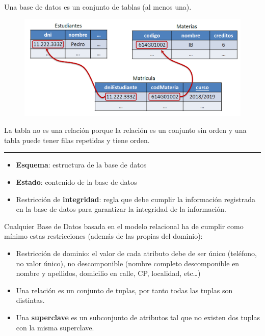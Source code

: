 \documentclass[]{book}
\begin{document}
Una base de datos es un conjunto de tablas (al menos una).

\begin{figure}
\centering
\includegraphics[width=6.25000in]{images/BBDD.png}
\caption{}
\end{figure}

La tabla no es una relación porque la relación es un conjunto sin orden
y una tabla puede tener filas repetidas y tiene orden.

\begin{center}\rule{0.5\linewidth}{\linethickness}\end{center}

\begin{itemize}
\item
  \textbf{Esquema}: estructura de la base de datos
\item
  \textbf{Estado}: contenido de la base de datos
\item
  Restricción de \textbf{integridad}: regla que debe cumplir la
  información registrada en la base de datos para garantizar la
  integridad de la información.
\end{itemize}

Cualquier Base de Datos basada en el modelo relacional ha de cumplir
como mínimo estas restricciones (además de las propias del dominio):

\begin{itemize}
\item
  Restricción de dominio: el valor de cada atributo debe de ser único
  (teléfono, no valor único), no descomponible (nombre completo
  descomponible en nombre y apellidos, domicilio en calle, CP,
  localidad, etc\ldots{})
\item
  Una relación es un conjunto de tuplas, por tanto todas las tuplas son
  distintas.
\item
  Una \textbf{superclave} es un subconjunto de atributos tal que no
  existen dos tuplas con la misma superclave.
\end{itemize}
\end{document}
